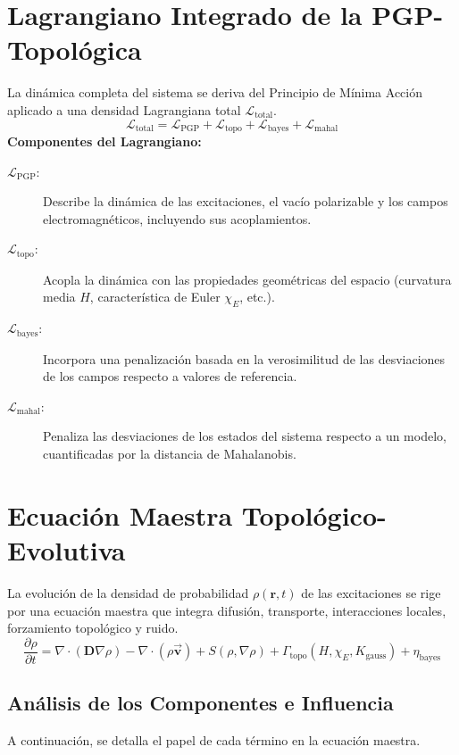 \documentclass{book} %
\newcommand{\bvec}[1]{\vec{\mathbf{#1}}} %
\begin{document}
\section{Lagrangiano Integrado de la PGP-Topológica}
La dinámica completa del sistema se deriva del Principio de Mínima Acción aplicado a una densidad Lagrangiana total $\mathcal{L}_{\text{total}}$.
\begin{equation}
    \mathcal{L}_{\text{total}}=\mathcal{L}_{\text{PGP}}+\mathcal{L}_{\text{topo}}+\mathcal{L}_{\text{bayes}}+\mathcal{L}_{\text{mahal}}
\end{equation}
\textbf{Componentes del Lagrangiano:}
\begin{description}
    \item[$\mathcal{L}_{\text{PGP}}$:] Describe la dinámica de las excitaciones, el vacío polarizable y los campos electromagnéticos, incluyendo sus acoplamientos.
    \item[$\mathcal{L}_{\text{topo}}$:] Acopla la dinámica con las propiedades geométricas del espacio (curvatura media $H$, característica de Euler $\chi_E$, etc.).
    \item[$\mathcal{L}_{\text{bayes}}$:] Incorpora una penalización basada en la verosimilitud de las desviaciones de los campos respecto a valores de referencia.
    \item[$\mathcal{L}_{\text{mahal}}$:] Penaliza las desviaciones de los estados del sistema respecto a un modelo, cuantificadas por la distancia de Mahalanobis.
\end{description}

\section{Ecuación Maestra Topológico-Evolutiva}
La evolución de la densidad de probabilidad $\rho(\mathbf{r},t)$ de las excitaciones se rige por una ecuación maestra que integra difusión, transporte, interacciones locales, forzamiento topológico y ruido.
\begin{equation}
    \frac{\partial\rho}{\partial t}=\nabla\cdot(\mathbf{D}\nabla\rho)-\nabla\cdot(\rho\bvec{v})+S(\rho,\nabla\rho)+\Gamma_{\text{topo}}(H,\chi_E,K_{\text{gauss}})+\eta_{\text{bayes}}
\end{equation}
\subsection{Análisis de los Componentes e Influencia}
A continuación, se detalla el papel de cada término en la ecuación maestra.
\end{document}
